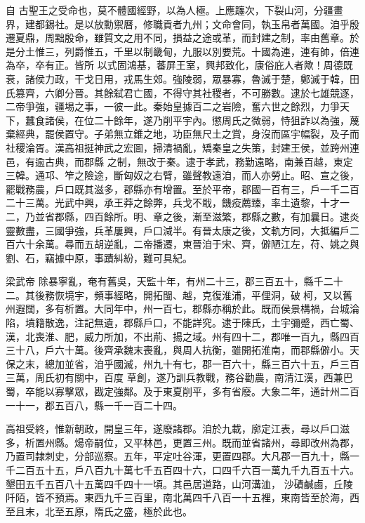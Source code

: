 
\begin{pinyinscope}

 自
 古聖王之受命也，莫不體國經野，以為人極。上應躔次，下裂山河，分疆畫界，建都錫社。是以放勳禦曆，修職貢者九州；文命會同，執玉帛者萬國。洎乎殷遷夏鼎，周黜殷命，雖質文之用不同，損益之途或革，而封建之制，率由舊章。於是分土惟三，列爵惟五，千里以制畿甸，九服以別要荒。十國為連，連有帥，倍連為卒，卒有正。皆所
 以式固鴻基，蕃屏王室，興邦致化，康俗庇人者歟！周德既衰，諸侯力政，干戈日用，戎馬生郊。強陵弱，眾暴寡，魯滅于楚，鄭滅于韓，田氏篡齊，六卿分晉。其餘弑君亡國，不得守其社稷者，不可勝數。逮於七雄競逐，二帝爭強，疆埸之事，一彼一此。秦始皇據百二之岩險，奮六世之餘烈，力爭天下，蠶食諸侯，在位二十餘年，遂乃削平宇內。懲周氏之微弱，恃狙詐以為強，蔑棄經典，罷侯置守。子弟無立錐之地，功臣無尺土之賞，身沒而區宇幅裂，及子而社稷淪胥。漢高祖挺神武之宏圖，掃清禍亂，矯秦皇之失策，封建王侯，並跨州連邑，有逾古典，而郡縣
 之制，無改于秦。逮于孝武，務勤遠略，南兼百越，東定三韓。通邛、笮之險途，斷匈奴之右臂，雖聲教遠洎，而人亦勞止。昭、宣之後，罷戰務農，戶口既其滋多，郡縣亦有增置。至於平帝，郡國一百有三，戶一千二百二十三萬。光武中興，承王莽之餘弊，兵戈不戢，饑疫薦臻，率土遺黎，十才一二，乃並省郡縣，四百餘所。明、章之後，漸至滋繁，郡縣之數，有加曩日。逮炎靈數盡，三國爭強，兵革屢興，戶口減半。有晉太康之後，文軌方同，大抵編戶二百六十余萬。尋而五胡逆亂，二帝播遷，東晉洎于宋、齊，僻陋江左，苻、姚之與劉、石，竊據中原，事蹟糾紛，難可具紀。



 梁武帝
 除暴寧亂，奄有舊吳，天監十年，有州二十三，郡三百五十，縣千二十二。其後務恢境宇，頻事經略，開拓閩、越，克復淮浦，平俚洞，破柯，又以舊州遐闊，多有析置。大同年中，州一百七，郡縣亦稱於此。既而侯景構禍，台城淪陷，墳籍散逸，注記無遺，郡縣戶口，不能詳究。逮于陳氏，土宇彌蹙，西亡蜀、漢，北喪淮、肥，威力所加，不出荊、揚之域。州有四十二，郡唯一百九，縣四百三十八，戶六十萬。後齊承魏末喪亂，與周人抗衡，雖開拓淮南，而郡縣僻小。天保之末，總加並省，洎乎國滅，州九十有七，郡一百六十，縣三百六十五，戶三百三萬，周氏初有關中，百度
 草創，遂乃訓兵教戰，務谷勸農，南清江漢，西兼巴蜀，卒能以寡擊眾，戡定強鄰。及于東夏削平，多有省廢。大象二年，通計州二百一十一，郡五百八，縣一千一百二十四。



 高祖受終，惟新朝政，開皇三年，遂廢諸郡。洎於九載，廓定江表，尋以戶口滋多，析置州縣。煬帝嗣位，又平林邑，更置三州。既而並省諸州，尋即改州為郡，乃置司隸刺史，分部巡察。五年，平定吐谷渾，更置四郡。大凡郡一百九十，縣一千二百五十五，戶八百九十萬七千五百四十六，口四千六百一萬九千九百五十六。墾田五千五百八十五萬四千四十一頃。其邑居道路，山河溝洫，
 沙磧鹹鹵，丘陵阡陌，皆不預焉。東西九千三百里，南北萬四千八百一十五裡，東南皆至於海，西至且末，北至五原，隋氏之盛，極於此也。




\end{pinyinscope}
